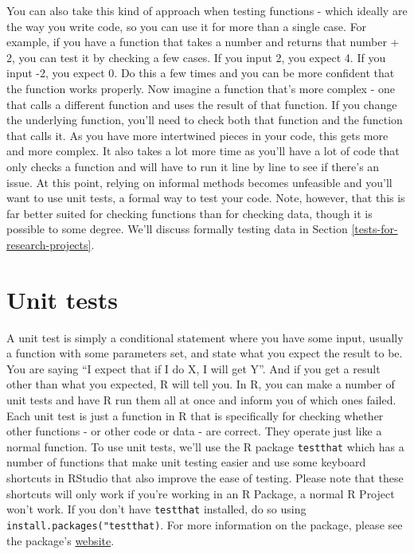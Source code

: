 \documentclass[
  12pt,
  openany]{book}
\begin{document}
You can also take this kind of approach when testing functions - which ideally are the way you write code, so you can use it for more than a single case. For example, if you have a function that takes a number and returns that number + 2, you can test it by checking a few cases. If you input 2, you expect 4. If you input -2, you expect 0. Do this a few times and you can be more confident that the function works properly. Now imagine a function that's more complex - one that calls a different function and uses the result of that function. If you change the underlying function, you'll need to check both that function and the function that calls it. As you have more intertwined pieces in your code, this gets more and more complex. It also takes a lot more time as you'll have a lot of code that only checks a function and will have to run it line by line to see if there's an issue. At this point, relying on informal methods becomes unfeasible and you'll want to use unit tests, a formal way to test your code. Note, however, that this is far better suited for checking functions than for checking data, though it is possible to some degree. We'll discuss formally testing data in Section \ref{tests-for-research-projects}.

\hypertarget{unit-tests}{%
\section{Unit tests}\label{unit-tests}}

A unit test is simply a conditional statement where you have some input, usually a function with some parameters set, and state what you expect the result to be. You are saying ``I expect that if I do X, I will get Y''. And if you get a result other than what you expected, R will tell you. In R, you can make a number of unit tests and have R run them all at once and inform you of which ones failed. Each unit test is just a function in R that is specifically for checking whether other functions - or other code or data - are correct. They operate just like a normal function. To use unit tests, we'll use the R package \texttt{testthat} which has a number of functions that make unit testing easier and use some keyboard shortcuts in RStudio that also improve the ease of testing. Please note that these shortcuts will only work if you're working in an R Package, a normal R Project won't work. If you don't have \texttt{testthat} installed, do so using \texttt{install.packages("testthat)}. For more information on the package, please see the package's \href{https://testthat.r-lib.org/index.html}{website}.
\end{document}
